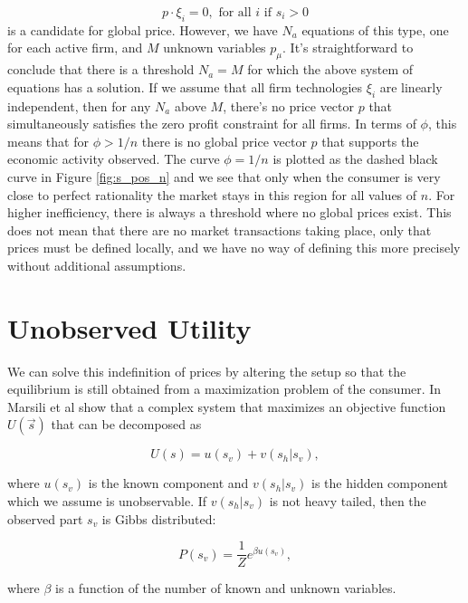 \begin{equation}
  \label{eq:inef_3}
p \cdot \xi_i = 0, \text{ for all } i \text{ if } s_i > 0  
\end{equation}
is a candidate for global price. However, we have $N_a$ equations
of this type, one for each active firm, and $M$ unknown variables
$p_\mu$. It's straightforward to conclude that there is a threshold $N_a = M$ for
which the above system of equations has a solution. If we assume that all firm
technologies $\xi_i$ are linearly independent, then for any $N_a$
above $M$, there's no price vector $p$ that simultaneously satisfies
the zero profit constraint for all firms. In terms of $\phi$, this
means that for $\phi > 1/n$ there is no global price vector $p$ that
supports the economic activity observed. The curve $\phi = 1/n$ is plotted as
the dashed black curve in Figure \ref{fig:s_pos_n} and we see that
only when the consumer is very close to perfect rationality the market stays in this
region for all values of $n$. For higher inefficiency, there is always
a threshold where no global prices exist. This does not mean that there are no
market transactions taking place, only that prices must be
defined locally, and we have no way of defining this more precisely
without additional assumptions.

\section{Unobserved Utility}

We can solve this indefinition of prices by altering the setup so that
the equilibrium is still obtained from a maximization problem of the
consumer. In \cite{Marsili13} Marsili et al show that a complex system that maximizes an objective function $U(\vec{s})$ that can be decomposed as

\begin{equation}
    U(s) = u(s_v) + v(s_h | s_v),
\end{equation}

where $u(s_v)$ is the known component and $v(s_h | s_v)$ is the hidden component which we assume is unobservable. If $v(s_h | s_v)$ is not heavy tailed, then the observed part $s_v$ is Gibbs distributed:

\begin{equation}
  P(s_v) = \frac{1}{Z}e^{\beta u(s_v)},
\end{equation}

where $\beta$ is a function of the number of known and unknown variables.

